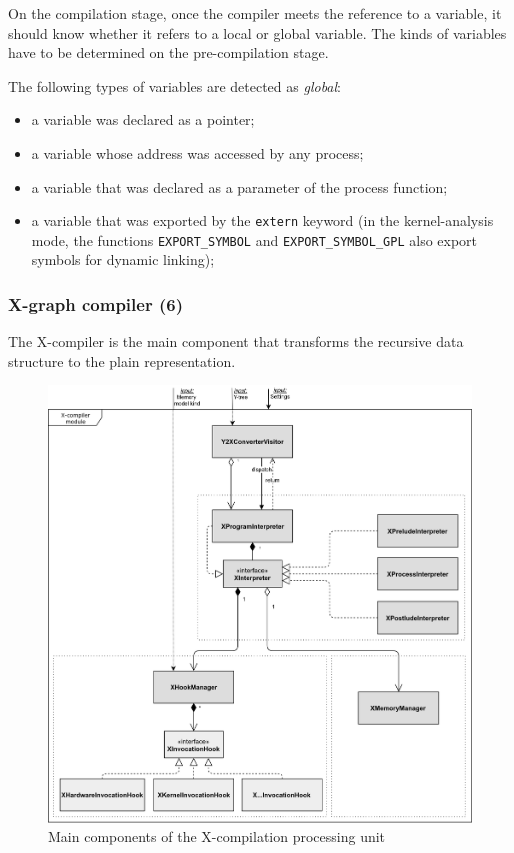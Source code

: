 On the compilation stage, once the compiler meets the reference to a variable, it should know whether it refers to a local or global variable.
The kinds of variables have to be determined on the pre-compilation stage.

\vspace{1em}
The following types of variables are detected as \textit{global}:
\begin{itemize}
\item a variable was declared as a pointer;
\item a variable whose address was accessed by any process;
\item a variable that was declared as a parameter of the process function;
\item a variable that was exported by the \texttt{extern} keyword (in the kernel-analysis mode, the functions \texttt{EXPORT\_SYMBOL} and \texttt{EXPORT\_SYMBOL\_GPL} also export symbols for dynamic linking); %
\end{itemize}


\subsubsection{X-graph compiler (6)}
\label{ch:impl:proc:x-compiler}

The X-compiler is the main component that transforms the recursive \ytree{} data structure to the plain \xgraph{} representation.

\begin{figure}[!t]%
    \centering
  \includegraphics[max width=\textwidth,keepaspectratio]{img/my/draw.io/X-compiler.png}
  \caption{Main components of the X-compilation processing unit}
  \label{fig:compiler}
\end{figure}


